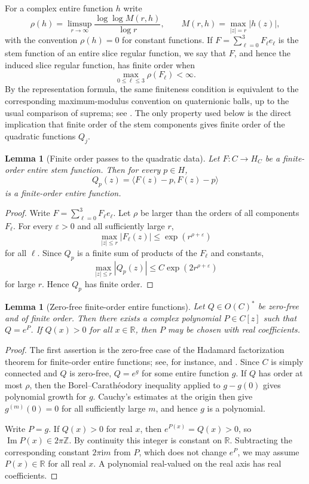 \documentclass[11pt]{amsart}
\def\HH{H}%
\def\HHc{H_C}%
\def\CC{C}%
\def\OO{O}%
\numberwithin{equation}{section}
\newtheorem{lemma}[theorem]{Lemma}
\theoremstyle{definition}
\theoremstyle{remark}
\newcommand{\HH}{\mathbb H}
\newcommand{\CC}{\mathbb C}
\newcommand{\RR}{\mathbb R}
\newcommand{\ZZ}{\mathbb Z}
\newcommand{\OO}{\mathcal O}
\newcommand{\HHc}{\mathbb H_{\mathbb C}}
\begin{document}
For a complex entire function $h$ write
\[
\rho(h)=\limsup_{r\to\infty}\frac{\log\log M(r,h)}{\log r},
\qquad
M(r,h)=\max_{|z|=r}|h(z)|,
\]
with the convention $\rho(h)=0$ for constant functions.  If $F=\sum_{\ell=0}^3F_\ell e_\ell$ is the stem function of an entire slice regular function, we say that $F$, and hence the induced slice regular function, has finite order when
\[
\max_{0\le \ell\le3}\rho(F_\ell)<\infty .
\]
By the representation formula, the same finiteness condition is equivalent to the corresponding maximum-modulus convention on quaternionic balls, up to the usual comparison of suprema; see \cite{GentiliStoppatoStruppa2013Regular}.  The only property used below is the direct implication that finite order of the stem components gives finite order of the quadratic functions $Q_j$.

\begin{lemma}[Finite order passes to the quadratic data]\label{lem:finite-order-passes}
Let $F:\CC\to\HHc$ be a finite-order entire stem function.  Then for every $p\in\HH$,
\[
Q_p(z)=\langle F(z)-p,F(z)-p\rangle
\]
is a finite-order entire function.
\end{lemma}

\begin{proof}
Write $F=\sum_{\ell=0}^3F_\ell e_\ell$.  Let $\rho$ be larger than the orders of all components $F_\ell$.  For every $\varepsilon>0$ and all sufficiently large $r$,
\[
\max_{|z|\le r}|F_\ell(z)|\le \exp(r^{\rho+\varepsilon})
\]
for all $\ell$.  Since $Q_p$ is a finite sum of products of the $F_\ell$ and constants,
\[
\max_{|z|\le r}|Q_p(z)|\le C\exp(2r^{\rho+\varepsilon})
\]
for large $r$.  Hence $Q_p$ has finite order.
\end{proof}

\begin{lemma}[Zero-free finite-order entire functions]\label{lem:finite-order-zero-free}
Let $Q\in\OO(\CC)^*$ be zero-free and of finite order. Then there exists a complex polynomial $P\in\CC[z]$ such that $Q=e^P$. If $Q(x)>0$ for all $x\in\RR$, then $P$ may be chosen with real coefficients.
\end{lemma}

\begin{proof}
The first assertion is the zero-free case of the Hadamard factorization theorem for finite-order entire functions; see, for instance, \cite[Ch.~I, \S\S~8--9]{Boas1954EntireFunctions} and \cite[Ch.~I, \S\S~1--3]{Levin1980Zeros}.  Since $\CC$ is simply connected and $Q$ is zero-free, $Q=e^g$ for some entire function $g$.  If $Q$ has order at most $\rho$, then the Borel--Carath\'eodory inequality applied to $g-g(0)$ gives polynomial growth for $g$.  Cauchy's estimates at the origin then give $g^{(m)}(0)=0$ for all sufficiently large $m$, and hence $g$ is a polynomial.

Write $P=g$.  If $Q(x)>0$ for real $x$, then $e^{P(x)}=Q(x)>0$, so $\operatorname{Im}P(x)\in2\pi\ZZ$.  By continuity this integer is constant on $\RR$.  Subtracting the corresponding constant $2\pi\mathrm i m$ from $P$, which does not change $e^P$, we may assume $P(x)\in\RR$ for all real $x$.  A polynomial real-valued on the real axis has real coefficients.
\end{proof}
\end{document}
